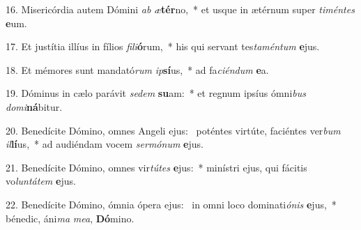 16. Misericórdia autem Dómini \textit{ab} \textit{æ}\textbf{tér}no,~*  et usque in ætérnum super \textit{ti}\textit{mén}\textit{tes} \textbf{e}um.\

17. Et justítia illíus in fílios \textit{fi}\textit{li}\textbf{ó}rum,~*  his qui servant tes\textit{ta}\textit{mén}\textit{tum} \textbf{e}jus.\

18. Et mémores sunt mandató\textit{rum} \textit{ip}\textbf{sí}us,~*  ad fa\textit{ci}\textit{én}\textit{dum} \textbf{e}a.\

19. Dóminus in cælo parávit \textit{se}\textit{dem} \textbf{su}am:~*  et regnum ipsíus ómni\textit{bus} \textit{do}\textit{mi}\textbf{ná}bitur.\

20. Benedícite Dómino, omnes Angeli ejus: \dag\  poténtes virtúte, faciéntes ver\textit{bum} \textit{il}\textbf{lí}us,~*  ad audiéndam vocem \textit{ser}\textit{mó}\textit{num} \textbf{e}jus.\

21. Benedícite Dómino, omnes vir\textit{tú}\textit{tes} \textbf{e}jus:~*  minístri ejus, qui fácitis vo\textit{lun}\textit{tá}\textit{tem} \textbf{e}jus.\

22. Benedícite Dómino, ómnia ópera ejus: \dag\  in omni loco dominati\textit{ó}\textit{nis} \textbf{e}jus,~*  bénedic, áni\textit{ma} \textit{me}\textit{a}, \textbf{Dó}mino.\

